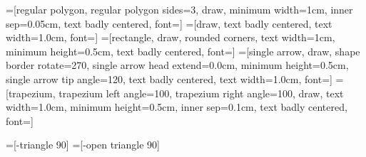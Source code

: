=[regular polygon,
                  regular polygon sides=3,
                  draw,
                  minimum width=1cm,
                  inner sep=0.05cm,
                  text badly centered,
                  font=\scriptsize]
=[draw,
                 text badly centered,
                 text width=1.0cm,
                 font=\scriptsize]
=[rectangle,
                  draw,
                  rounded corners,
                  text width=1cm,
                  minimum height=0.5cm,
                  text badly centered,
                  font=\scriptsize]
=[single arrow,
                      draw,
                      shape border rotate=270,
                      single arrow head extend=0.0cm,
                      minimum height=0.5cm,
                      single arrow tip angle=120,
                      text badly centered,
                      text width=1.0cm,
                      font=\scriptsize]
=[trapezium,
                     trapezium left angle=100,
                     trapezium right angle=100,
                     draw,
                     text width=1.0cm,
                     minimum height=0.5cm,
                     inner sep=0.1cm,
                     text badly centered,
                     font=\scriptsize]

=[-triangle 90]
=[-open triangle 90]
